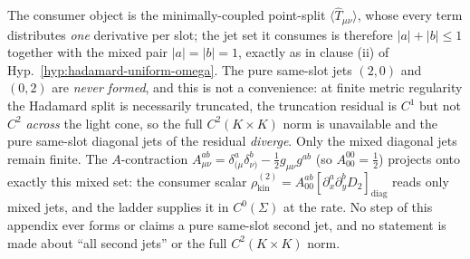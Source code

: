 \begin{remark}
\label{an17:mixed-jets}
The consumer object is the minimally-coupled point-split
$\langle\widehat T_{\mu\nu}\rangle$, whose every term distributes \emph{one}
derivative per slot; the jet set it consumes is therefore $|a|+|b|\le1$ together
with the mixed pair $|a|=|b|=1$, exactly as in clause (ii) of
Hyp.~\ref{hyp:hadamard-uniform-omega}. The pure same-slot jets $(2,0)$ and
$(0,2)$ are \emph{never formed}, and this is not a convenience: at finite metric
regularity the Hadamard split is necessarily truncated, the truncation residual
is $C^1$ but not $C^2$ \emph{across} the light cone, so the full $C^2(K\times K)$
norm is unavailable and the pure same-slot diagonal jets of the residual
\emph{diverge}. Only the mixed diagonal jets remain finite. The $A$-contraction
$A^{ab}_{\mu\nu}=\delta^a_{(\mu}\delta^b_{\nu)}-\tfrac12 g_{\mu\nu}g^{ab}$
(so $A^{00}_{00}=\tfrac12$) projects onto exactly this mixed set: the consumer
scalar
$\rho^{(2)}_{\mathrm{kin}}=A^{ab}_{00}[\partial_x^a\partial_y^bD_2]_{\mathrm{diag}}$
reads only mixed jets, and the ladder supplies it in $C^0(\Sigma)$ at the rate.
No step of this appendix ever forms or claims a pure same-slot second jet, and no
statement is made about ``all second jets'' or the full $C^2(K\times K)$ norm.
\end{remark}

